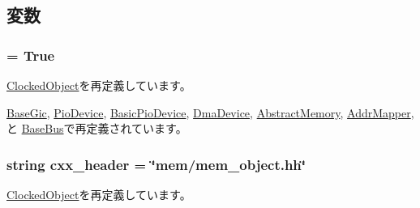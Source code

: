 \subsection{変数}
\hypertarget{classMemObject_1_1MemObject_a17fa61ac3806b481cafee5593b55e5d0}{
\subsubsection[{abstract}]{ = True}}
\label{classMemObject_1_1MemObject_a17fa61ac3806b481cafee5593b55e5d0}


\hyperlink{classClockedObject_1_1ClockedObject_a17fa61ac3806b481cafee5593b55e5d0}{ClockedObject}を再定義しています。

\hyperlink{classGic_1_1BaseGic_a17fa61ac3806b481cafee5593b55e5d0}{BaseGic}, \hyperlink{classDevice_1_1PioDevice_a17fa61ac3806b481cafee5593b55e5d0}{PioDevice}, \hyperlink{classDevice_1_1BasicPioDevice_a17fa61ac3806b481cafee5593b55e5d0}{BasicPioDevice}, \hyperlink{classDevice_1_1DmaDevice_a17fa61ac3806b481cafee5593b55e5d0}{DmaDevice}, \hyperlink{classAbstractMemory_1_1AbstractMemory_a17fa61ac3806b481cafee5593b55e5d0}{AbstractMemory}, \hyperlink{classAddrMapper_1_1AddrMapper_a17fa61ac3806b481cafee5593b55e5d0}{AddrMapper}, と \hyperlink{classBus_1_1BaseBus_a17fa61ac3806b481cafee5593b55e5d0}{BaseBus}で再定義されています。\hypertarget{classMemObject_1_1MemObject_a17da7064bc5c518791f0c891eff05fda}{
\subsubsection[{cxx\_\-header}]{\setlength{\rightskip}{0pt plus 5cm}string {\bf cxx\_\-header} = \char`\"{}mem/mem\_\-object.hh\char`\"{}}}
\label{classMemObject_1_1MemObject_a17da7064bc5c518791f0c891eff05fda}


\hyperlink{classClockedObject_1_1ClockedObject_a17da7064bc5c518791f0c891eff05fda}{ClockedObject}を再定義しています。

